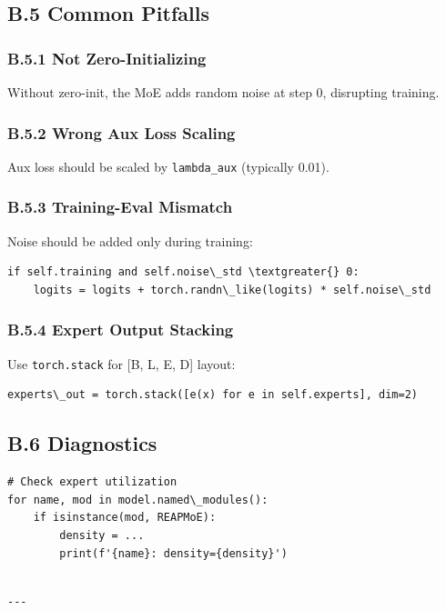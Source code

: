 \subsection{B.5 Common Pitfalls}

\subsubsection{B.5.1 Not Zero-Initializing}

Without zero-init, the MoE adds random noise at step 0, disrupting training.

\subsubsection{B.5.2 Wrong Aux Loss Scaling}

Aux loss should be scaled by \texttt{lambda\_aux} (typically 0.01).

\subsubsection{B.5.3 Training-Eval Mismatch}

Noise should be added only during training:

\begin{lstlisting}
if self.training and self.noise\_std \textgreater{} 0:
    logits = logits + torch.randn\_like(logits) * self.noise\_std
\end{lstlisting}

\subsubsection{B.5.4 Expert Output Stacking}

Use \texttt{torch.stack} for [B, L, E, D] layout:

\begin{lstlisting}
experts\_out = torch.stack([e(x) for e in self.experts], dim=2)
\end{lstlisting}

\subsection{B.6 Diagnostics}

\begin{lstlisting}
# Check expert utilization
for name, mod in model.named\_modules():
    if isinstance(mod, REAPMoE):
        density = ...
        print(f'{name}: density={density}')
\end{lstlisting}
\begin{lstlisting}

---
\end{lstlisting}